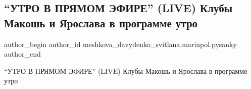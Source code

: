  
 
 
 
 

\subsection{\enquote{УТРО В ПРЯМОМ ЭФИРЕ} (LIVE) Клубы Макошь и Ярослава в программе утро}
\label{sec:25_03_2017.fb.meshkova_davydenko_svitlana.mariupol.pysanky.1.utro_v_prjamom_efire_kluby_makosh_jaroslava}

\ifcmt
 author_begin
   author_id meshkova_davydenko_svitlana.mariupol.pysanky
 author_end
\fi

\enquote{УТРО В ПРЯМОМ ЭФИРЕ} (LIVE) Клубы Макошь и Ярослава в программе утро
